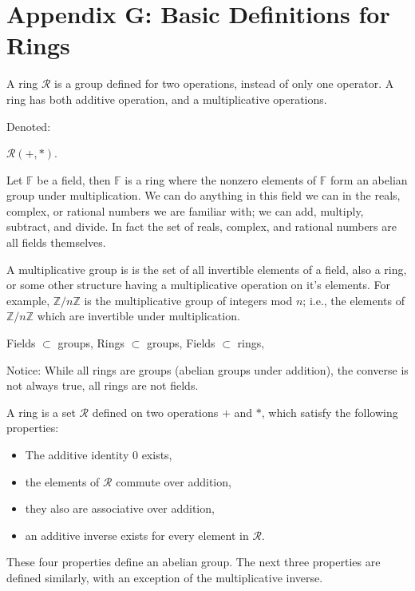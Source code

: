 \section{Appendix G: Basic Definitions for Rings}


A ring $\mathcal{R}$ is a group defined for two operations, instead of only one operator. A ring has both additive operation, and a multiplicative operations. 

Denoted:

$\mathcal{R}(+,\ast)$. 


Let $\mathbb{F}$ be a field, then $\mathbb{F}$ is a ring where the nonzero elements of $\mathbb{F}$ form an abelian group under multiplication. We can do anything in this field we can in the reals, complex, or rational numbers we are familiar with; we can add, multiply, subtract, and divide. In fact the set of reals, complex, and rational numbers are all fields themselves.


A multiplicative group is is the set of all invertible elements of a field, also a ring, or some other structure having a multiplicative operation on it's elements. For example, $\mathbb{Z}/n\mathbb{Z}$ is the multiplicative group of integers mod $n$; i.e., the elements of $\mathbb{Z}/n\mathbb{Z}$ which are invertible under multiplication. 


\begin{nt}
    
    Fields $\subset$ groups,
    Rings $\subset$ groups, 
    Fields $\subset$ rings, 
   	
    Notice: 
    \textrm{While all rings are groups (abelian groups under addition), the converse is not always true, all rings are not  fields.}
\end{nt}


    
A ring is a set $\mathcal{R}$ defined on two operations $+$ and $\ast$, which satisfy the following properties:
    
\begin{itemize}
    \item The additive identity $0$ exists,
    \item the elements of $\mathcal{R}$ commute over addition,
    \item they also are associative over addition,
    \item an additive inverse exists for every element in $\mathcal{R}$.
\end{itemize}

These four properties define an abelian group.
The next three properties are defined similarly, with an exception of the multiplicative inverse.


